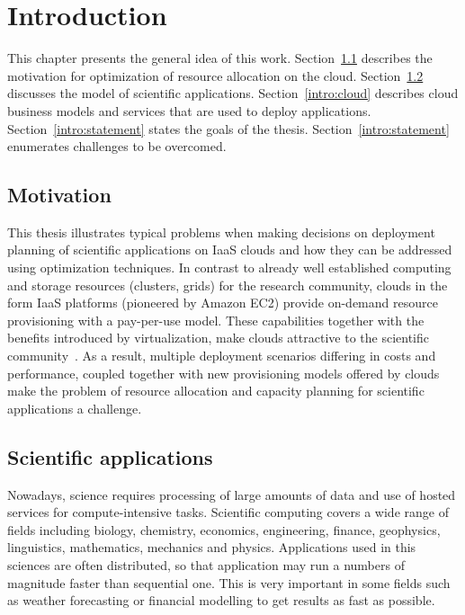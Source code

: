 \chapter{Introduction}
\label{chap:introduction} 

This chapter presents the general idea of this work. Section~\ref{intro:motivation} describes the motivation for optimization of resource allocation on the cloud. Section~\ref{intro:application} discusses the model of scientific applications. Section~\ref{intro:cloud} describes cloud business models and services that are used to deploy applications. Section~\ref{intro:statement} states the goals of the thesis. Section~\ref{intro:statement} enumerates challenges to be overcomed. 

\section{Motivation}
\label{intro:motivation}

This thesis illustrates typical problems when making decisions on deployment planning of scientific applications on IaaS clouds and how they can be addressed using optimization techniques. In contrast to already well established computing and storage resources (clusters, grids) for the research community, clouds in the form IaaS  platforms (pioneered by Amazon EC2) provide on-demand resource provisioning with a pay-per-use model. These capabilities together with the benefits introduced by virtualization, make clouds attractive to the scientific community~\cite{Deelman09}. As a result, multiple deployment scenarios differing in costs and performance, coupled together with new provisioning models offered by clouds make the problem of resource allocation and capacity planning for scientific applications a challenge.



\section{Scientific applications}
\label{intro:application}

Nowadays, science requires processing of large amounts of data and use of hosted services for compute-intensive tasks\cite{Foster06052005}. Scientific computing covers a wide range of fields including biology, chemistry, economics, engineering, finance, geophysics, linguistics, mathematics, mechanics and physics. Applications used in this sciences are often distributed, so that application may run a numbers of magnitude faster than sequential one. This is very important in some fields such as weather forecasting or financial modelling to get results as fast as possible. 


